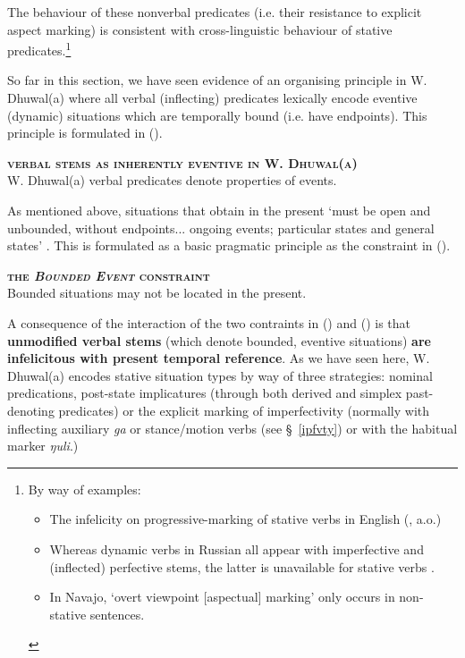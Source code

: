 \documentclass[11pt,dvipsnames]{report}
\begin{document}
The behaviour of these nonverbal predicates (i.e. their resistance to explicit aspect marking) is consistent with cross-linguistic behaviour of stative predicates.\footnote{By way of examples:\begin{itemize}\item The infelicity on progressive-marking of stative verbs in English (\citealp[e.g.][55]{Dowty1979}, \citealp[205]{Taylor1977} a.o.)
		\item Whereas dynamic verbs in Russian all appear with imperfective and (inflected) perfective stems, the latter is unavailable for stative verbs \citep[227]{Smith1997}.
		\item In Navajo, `overt viewpoint [aspectual] marking' only occurs in non-stative sentences\citep[297]{Smith1997}.\end{itemize}}
	


So far in this section, we have seen evidence of an organising principle in W. Dhuwal(a) where all verbal (inflecting) predicates lexically encode eventive (dynamic) situations which are temporally bound (i.e. have endpoints). This principle is formulated in (\nextx).



\ex \textbf{\textsc{verbal stems as inherently eventive in W. Dhuwal(a)}}\\
W. Dhuwal(a) verbal predicates denote properties of events.
\xe


As mentioned above, situations that obtain in the present `must be open and unbounded, without endpoints... ongoing events; particular states and general states' \citet[230]{Smith2008}. This is formulated as a basic pragmatic principle as the constraint in (\nextx).

\ex  \textsc{\textbf{the \textit{Bounded Event} constraint}}\\
Bounded situations may not be located in the present.\hfill\citep[231]{Smith2008}
\xe


A consequence of the interaction of the two contraints in () and () is that\textbf{ unmodified verbal stems} (which denote bounded, eventive situations) \textbf{are} \textbf{infelicitous with present temporal reference}. As we have seen here, W. Dhuwal(a) encodes stative situation types by way of three strategies:
\pex[nopreamble]\a nominal predications,
	\a post-state implicatures (through both derived and simplex past-denoting predicates) or 
	\a the explicit marking of imperfectivity (normally with inflecting auxiliary \textit{ga} or stance/motion verbs (see §~\ref{ipfvty}) or with the habitual marker \textit{ŋuli}.)\xe
\end{document}
